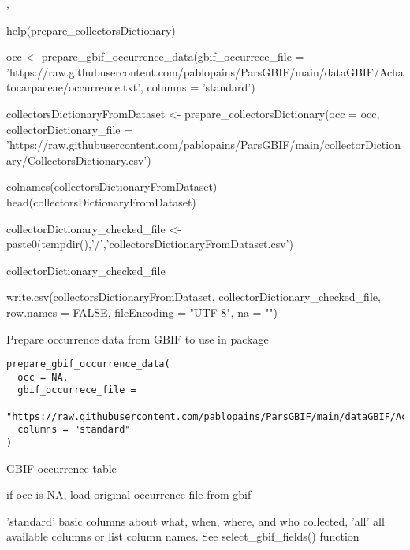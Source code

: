 \documentclass[a4paper]{book}
\begin{document}
%
\begin{SeeAlso}
, 
\end{SeeAlso}
%
\begin{Examples}
\begin{ExampleCode}

help(prepare_collectorsDictionary)

occ <- prepare_gbif_occurrence_data(gbif_occurrece_file =  'https://raw.githubusercontent.com/pablopains/ParsGBIF/main/dataGBIF/Achatocarpaceae/occurrence.txt',
                                    columns = 'standard')

collectorsDictionaryFromDataset <- prepare_collectorsDictionary(occ = occ,
                                                                collectorDictionary_file =  'https://raw.githubusercontent.com/pablopains/ParsGBIF/main/collectorDictionary/CollectorsDictionary.csv')

colnames(collectorsDictionaryFromDataset)
head(collectorsDictionaryFromDataset)

collectorDictionary_checked_file <- paste0(tempdir(),'/','collectorsDictionaryFromDataset.csv')

collectorDictionary_checked_file

write.csv(collectorsDictionaryFromDataset,
          collectorDictionary_checked_file,
          row.names = FALSE,
          fileEncoding = "UTF-8",
          na = "")

\end{ExampleCode}
\end{Examples}
%
\begin{Description}
Prepare occurrence data from GBIF to use in package
\end{Description}
%
\begin{Usage}
\begin{verbatim}
prepare_gbif_occurrence_data(
  occ = NA,
  gbif_occurrece_file =
    "https://raw.githubusercontent.com/pablopains/ParsGBIF/main/dataGBIF/Achatocarpaceae/occurrence.txt",
  columns = "standard"
)
\end{verbatim}
\end{Usage}
%
\begin{Arguments}
\begin{ldescription}
\item[\code{occ}] GBIF occurrence table

\item[\code{gbif\_occurrece\_file}] if occ is NA, load original occurrence file from gbif

\item[\code{columns}] 'standard' basic columns about what, when, where, and who collected, 'all' all available columns or list column names. See select\_gbif\_fields() function
\end{ldescription}
\end{Arguments}
\end{document}
